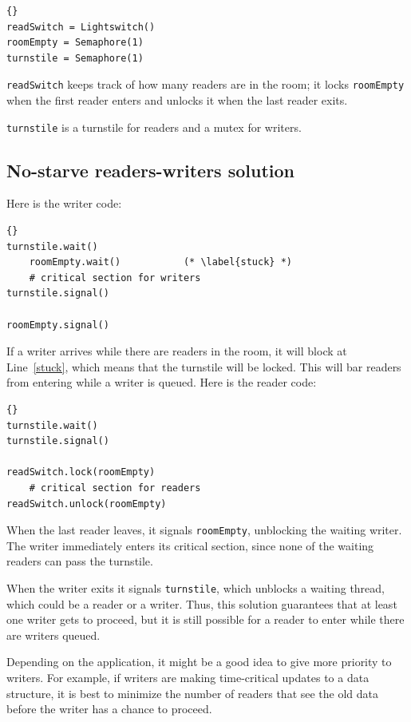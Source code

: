 \documentclass{book}
\begin{document}
\begin{lstlisting}[title={No-starve readers-writers initialization}]{}
readSwitch = Lightswitch()
roomEmpty = Semaphore(1)
turnstile = Semaphore(1)
\end{lstlisting}

{\tt readSwitch} keeps track of how many readers are in the room; it locks {\tt roomEmpty} when the first reader enters and unlocks it when the last reader exits.

    {\tt turnstile} is a turnstile for readers and a mutex for writers.


\newpage
\subsection {No-starve readers-writers solution}

Here is the writer code:

\begin{lstlisting}[title={No-starve writer solution}]{}
turnstile.wait()
    roomEmpty.wait()           (* \label{stuck} *)
    # critical section for writers
turnstile.signal()

roomEmpty.signal()
\end{lstlisting}

If a writer arrives while there are readers in the room, it
will block at Line~\ref{stuck}, which means that the turnstile will
be locked.  This will bar readers from entering while a writer
is queued.  Here is the reader code:

\begin{lstlisting}[title={No-starve reader solution}]{}
turnstile.wait()
turnstile.signal()

readSwitch.lock(roomEmpty)
    # critical section for readers
readSwitch.unlock(roomEmpty)
\end{lstlisting}

When the last reader leaves, it signals {\tt roomEmpty},
unblocking the waiting writer.  The writer immediately
enters its critical section, since none of the waiting
readers can pass the turnstile.

When the writer exits it signals {\tt turnstile}, which unblocks a
waiting thread, which could be a reader or a writer.  Thus, this
solution guarantees that at least one writer gets to proceed, but it
is still possible for a reader to enter while there are writers
queued.

Depending on the application, it might be a good idea to
give more priority to writers.  For example, if writers are making
time-critical updates to a data structure, it is best
to minimize the number of readers that see the old data before
the writer has a chance to proceed.
\end{document}
